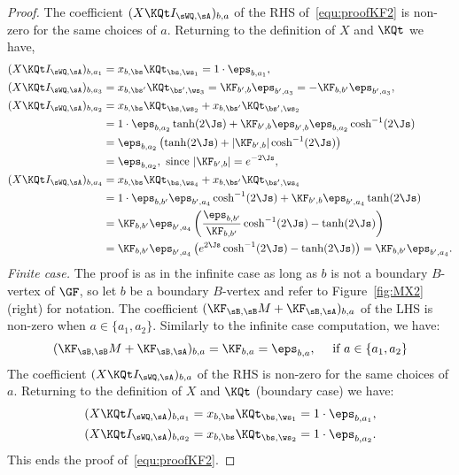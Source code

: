 \documentclass[a4paper,twoside,11pt]{article}
\begin{document}
\begin{proof}
The coefficient $(X \KQt I_{\sWQ,\sA})_{b,a}$ of the RHS of~\eqref{equ:proofKF2} is non-zero for the same choices of $a$. Returning to the definition
of $X$ and $\KQt$ we have,
\begin{align}
(X \KQt I_{\sWQ,\sA})_{b,a_1}&=x_{b,\bs}\KQt_{\bs,\ws_1}=1\cdot \eps_{b,a_1},\nonumber\\
(X \KQt I_{\sWQ,\sA})_{b,a_3}&=x_{b,\bs'}\KQt_{\bs',\ws_3}=\KF_{b',b}\eps_{b',a_3}=-\KF_{b,b'}\eps_{b',a_3},\nonumber\\
(X \KQt I_{\sWQ,\sA})_{b,a_2}&=x_{b,\bs}\KQt_{\bs,\ws_2}+x_{b,\bs'}\KQt_{\bs',\ws_2}\nonumber\\
&=1\cdot \eps_{b,a_2}\tanh(2\Js) + \KF_{b',b}\eps_{b',b}\eps_{b,a_2}\cosh^{-1}(2\Js)\nonumber\\
&=\eps_{b,a_2}\left(\tanh(2\Js)+|\KF_{b',b}|\cosh^{-1}(2\Js)\right)\nonumber\\
&=\eps_{b,a_2},\text{ since }|\KF_{b',b}|=e^{-2\Js},\label{equ:reltanh}\\
(X \KQt I_{\sWQ,\sA})_{b,a_4}&=x_{b,\bs}\KQt_{\bs,\ws_4}+x_{b,\bs'}\KQt_{\bs',\ws_4}\nonumber\\
&=1\cdot \eps_{b,b'}\eps_{b',a_4}\cosh^{-1}(2\Js)+\KF_{b',b}\eps_{b',a_4}\tanh(2\Js)\nonumber\\
&=\KF_{b,b'}\eps_{b',a_4}
\left(\frac{\eps_{b,b'}}{\KF_{b,b'}}\cosh^{-1}(2\Js)-\tanh(2\Js)\right)\nonumber\\
&=\KF_{b,b'}\eps_{b',a_4}
\left(e^{2\Js}\cosh^{-1}(2\Js)-\tanh(2\Js)\right)=\KF_{b,b'}\eps_{b',a_4}.\label{equ:reltanh2}
\end{align}
\emph{Finite case.} The proof is as in the infinite case as long as $b$ is not a boundary $B$-vertex of $\GF$, so let
$b$ be a boundary $B$-vertex and refer to Figure~\ref{fig:MX2} (right) for notation. The coefficient $(\KF_{\sB,\sB}M+\KF_{\sB,\sA})_{b,a}$ of 
the LHS is non-zero when $a\in\{a_1,a_2\}$. Similarly to the infinite case computation, we have:
\begin{align*}
(\KF_{\sB,\sB}M+\KF_{\sB,\sA})_{b,a}=\KF_{b,a}=\eps_{b,a},\quad \text{ if $a\in\{a_1,a_2\}$}
\end{align*}
The coefficient $(X \KQt I_{\sWQ,\sA})_{b,a}$ of the RHS is non-zero for the same choices of $a$. Returning to the definition
of $X$ and $\KQt$ (boundary case) we have:
\begin{align*}
(X \KQt I_{\sWQ,\sA})_{b,a_1}&=x_{b,\bs}\KQt_{\bs,\ws_1}=1\cdot \eps_{b,a_1},\\
(X \KQt I_{\sWQ,\sA})_{b,a_2}&=x_{b,\bs}\KQt_{\bs,\ws_2}=1\cdot \eps_{b,a_2}.
\end{align*}
This ends the proof of~\eqref{equ:proofKF2}.


\end{proof}
\end{document}
